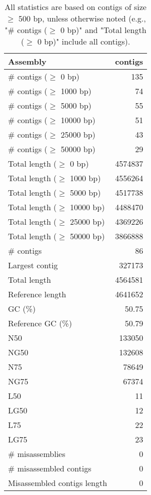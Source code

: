 \documentclass[12pt,a4paper]{article}
\begin{document}
\begin{table}[ht]
\begin{center}
\caption{All statistics are based on contigs of size $\geq$ 500 bp, unless otherwise noted (e.g., "\# contigs ($\geq$ 0 bp)" and "Total length ($\geq$ 0 bp)" include all contigs).}
\begin{tabular}{|l*{1}{|r}|}
\hline
Assembly & contigs \\ \hline
\# contigs ($\geq$ 0 bp) & 135 \\ \hline
\# contigs ($\geq$ 1000 bp) & 74 \\ \hline
\# contigs ($\geq$ 5000 bp) & 55 \\ \hline
\# contigs ($\geq$ 10000 bp) & 51 \\ \hline
\# contigs ($\geq$ 25000 bp) & 43 \\ \hline
\# contigs ($\geq$ 50000 bp) & 29 \\ \hline
Total length ($\geq$ 0 bp) & 4574837 \\ \hline
Total length ($\geq$ 1000 bp) & 4556264 \\ \hline
Total length ($\geq$ 5000 bp) & 4517738 \\ \hline
Total length ($\geq$ 10000 bp) & 4488470 \\ \hline
Total length ($\geq$ 25000 bp) & 4369226 \\ \hline
Total length ($\geq$ 50000 bp) & 3866888 \\ \hline
\# contigs & 86 \\ \hline
Largest contig & 327173 \\ \hline
Total length & 4564581 \\ \hline
Reference length & 4641652 \\ \hline
GC (\%) & 50.75 \\ \hline
Reference GC (\%) & 50.79 \\ \hline
N50 & 133050 \\ \hline
NG50 & 132608 \\ \hline
N75 & 78649 \\ \hline
NG75 & 67374 \\ \hline
L50 & 11 \\ \hline
LG50 & 12 \\ \hline
L75 & 22 \\ \hline
LG75 & 23 \\ \hline
\# misassemblies & 0 \\ \hline
\# misassembled contigs & 0 \\ \hline
Misassembled contigs length & 0 \\ \hline

\end{tabular}
\end{center}
\end{table}
\end{document}
